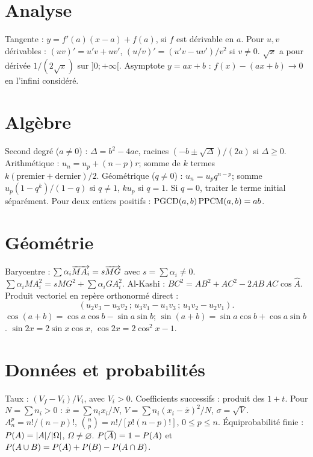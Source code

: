 \section{Analyse}
Tangente : $y=f'(a)(x-a)+f(a)$, si $f$ est dérivable en $a$.
Pour $u,v$ dérivables : $(uv)'=u'v+uv'$, $(u/v)'=(u'v-uv')/v^2$ si $v\ne0$.
$\sqrt{x}$ a pour dérivée $1/(2\sqrt{x})$ sur $]0;+\infty[$.
Asymptote $y=ax+b$ : $f(x)-(ax+b)\to0$ en l’infini considéré.
\section{Algèbre}
Second degré ($a\ne0$) : $\Delta=b^2-4ac$, racines $(-b\pm\sqrt\Delta)/(2a)$ si $\Delta\ge0$.
Arithmétique : $u_n=u_p+(n-p)r$; somme de $k$ termes $k(\text{premier}+\text{dernier})/2$.
Géométrique ($q\ne0$) : $u_n=u_pq^{n-p}$; somme $u_p(1-q^k)/(1-q)$ si $q\ne1$, $ku_p$ si $q=1$. Si $q=0$, traiter le terme initial séparément.
Pour deux entiers positifs : $\operatorname{PGCD}(a,b)\operatorname{PPCM}(a,b)=ab$.
\section{Géométrie}
Barycentre : $\sum\alpha_i\overrightarrow{MA_i}=s\overrightarrow{MG}$ avec $s=\sum\alpha_i\ne0$.
$\sum\alpha_i MA_i^2=sMG^2+\sum\alpha_i GA_i^2$.
Al-Kashi : $BC^2=AB^2+AC^2-2AB\,AC\cos\widehat A$.
Produit vectoriel en repère orthonormé direct :
\[
(u_2v_3-u_3v_2\,;\,u_3v_1-u_1v_3\,;\,u_1v_2-u_2v_1).
\]
$\cos(a+b)=\cos a\cos b-\sin a\sin b$;
$\sin(a+b)=\sin a\cos b+\cos a\sin b$.
$\sin2x=2\sin x\cos x$, $\cos2x=2\cos^2x-1$.
\section{Données et probabilités}
Taux : $(V_f-V_i)/V_i$, avec $V_i>0$. Coefficients successifs : produit des $1+t$.
Pour $N=\sum n_i>0$ : $\bar x=\sum n_ix_i/N$, $V=\sum n_i(x_i-\bar x)^2/N$, $\sigma=\sqrt V$.
$A_n^p=n!/(n-p)!$, $\binom np=n!/[p!(n-p)!]$, $0\le p\le n$.
Équiprobabilité finie : $P(A)=|A|/|\Omega|$, $\Omega\ne\varnothing$.
$P(\overline A)=1-P(A)$ et $P(A\cup B)=P(A)+P(B)-P(A\cap B)$.
